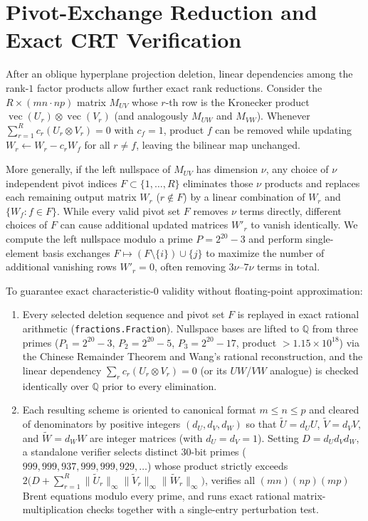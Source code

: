 \documentclass[11pt,a4paper]{article}
\begin{document}
\section{Pivot-Exchange Reduction and Exact CRT Verification}
After an oblique hyperplane projection deletion, linear dependencies among the rank-$1$ factor products allow further exact rank reductions. Consider the $R \times (mn\cdot np)$ matrix $M_{UV}$ whose $r$-th row is the Kronecker product $\operatorname{vec}(U_r) \otimes \operatorname{vec}(V_r)$ (and analogously $M_{UW}$ and $M_{VW}$). Whenever $\sum_{r=1}^R c_r (U_r \otimes V_r) = 0$ with $c_f = 1$, product $f$ can be removed while updating $W_r \leftarrow W_r - c_r W_f$ for all $r \neq f$, leaving the bilinear map unchanged.

More generally, if the left nullspace of $M_{UV}$ has dimension $\nu$, any choice of $\nu$ independent pivot indices $F \subset \{1,\dots,R\}$ eliminates those $\nu$ products and replaces each remaining output matrix $W_r$ ($r \notin F$) by a linear combination of $W_r$ and $\{W_f : f \in F\}$. While every valid pivot set $F$ removes $\nu$ terms directly, different choices of $F$ can cause additional updated matrices $W'_r$ to vanish identically. We compute the left nullspace modulo a prime $P = 2^{20}-3$ and perform single-element basis exchanges $F \mapsto (F\setminus\{i\})\cup\{j\}$ to maximize the number of additional vanishing rows $W'_r = 0$, often removing $3\nu$--$7\nu$ terms in total.

To guarantee exact characteristic-$0$ validity without floating-point approximation:
\begin{enumerate}
\item Every selected deletion sequence and pivot set $F$ is replayed in exact rational arithmetic (\texttt{fractions.Fraction}). Nullspace bases are lifted to $\mathbb{Q}$ from three primes ($P_1 = 2^{20}-3$, $P_2 = 2^{20}-5$, $P_3 = 2^{20}-17$, product $>1.15\times 10^{18}$) via the Chinese Remainder Theorem and Wang's rational reconstruction, and the linear dependency $\sum_r c_r (U_r \otimes V_r) = 0$ (or its $UW$/$VW$ analogue) is checked identically over $\mathbb{Q}$ prior to every elimination.
\item Each resulting scheme is oriented to canonical format $m\le n\le p$ and cleared of denominators by positive integers $(d_U, d_V, d_W)$ so that $\tilde{U} = d_U U$, $\tilde{V} = d_V V$, and $\tilde{W} = d_W W$ are integer matrices (with $d_U = d_V = 1$). Setting $D = d_U d_V d_W$, a standalone verifier selects distinct 30-bit primes ($999{,}999{,}937, 999{,}999{,}929, \dots$) whose product strictly exceeds $2\bigl(D + \sum_{r=1}^R \|\tilde{U}_r\|_\infty \|\tilde{V}_r\|_\infty \|\tilde{W}_r\|_\infty\bigr)$, verifies all $(mn)(np)(mp)$ Brent equations modulo every prime, and runs exact rational matrix-multiplication checks together with a single-entry perturbation test.
\end{enumerate}
\end{document}
